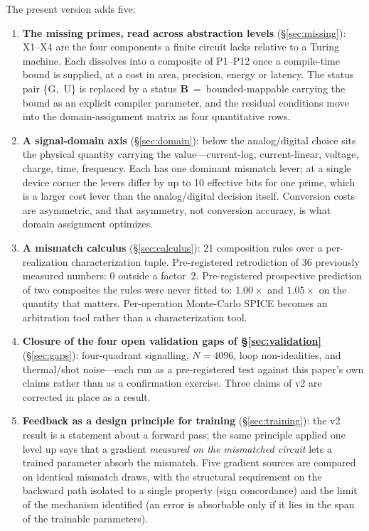 \documentclass[11pt]{article}
\begin{document}
\noindent The present version adds five:

\begin{enumerate}[leftmargin=*,start=7]
\item \textbf{The missing primes, read across abstraction levels} (\S\ref{sec:missing}): X1--X4 are the four components a finite circuit lacks relative to a Turing machine. Each dissolves into a composite of P1--P12 once a compile-time bound is supplied, at a cost in area, precision, energy or latency. The status pair \{G,~U\} is replaced by a status \textbf{B}~=~bounded-mappable carrying the bound as an explicit compiler parameter, and the residual conditions move into the domain-assignment matrix as four quantitative rows.

\item \textbf{A signal-domain axis} (\S\ref{sec:domain}): below the analog/digital choice sits the physical quantity carrying the value---current-log, current-linear, voltage, charge, time, frequency. Each has one dominant mismatch lever; at a single device corner the levers differ by up to 10 effective bits for one prime, which is a larger cost lever than the analog/digital decision itself. Conversion costs are asymmetric, and that asymmetry, not conversion accuracy, is what domain assignment optimizes.

\item \textbf{A mismatch calculus} (\S\ref{sec:calculus}): 21 composition rules over a per-realization characterization tuple. Pre-registered retrodiction of 36 previously measured numbers: 0 outside a factor~2. Pre-registered prospective prediction of two composites the rules were never fitted to: $1.00\times$ and $1.05\times$ on the quantity that matters. Per-operation Monte-Carlo SPICE becomes an arbitration tool rather than a characterization tool.

\item \textbf{Closure of the four open validation gaps of \S\ref{sec:validation}} (\S\ref{sec:gaps}): four-quadrant signalling, $N=4096$, loop non-idealities, and thermal/shot noise---each run as a pre-registered test against this paper's own claims rather than as a confirmation exercise. Three claims of v2 are corrected in place as a result.

\item \textbf{Feedback as a design principle for training} (\S\ref{sec:training}): the v2 result is a statement about a forward pass; the same principle applied one level up says that a gradient \textit{measured on the mismatched circuit} lets a trained parameter absorb the mismatch. Five gradient sources are compared on identical mismatch draws, with the structural requirement on the backward path isolated to a single property (sign concordance) and the limit of the mechanism identified (an error is absorbable only if it lies in the span of the trainable parameters).
\end{enumerate}
\end{document}
